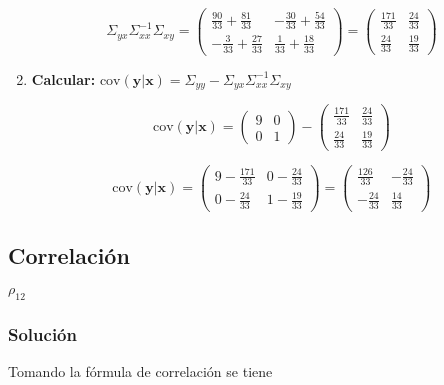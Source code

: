 \begin{enumerate}
    $$
    \Sigma_{yx} \Sigma_{xx}^{-1} \Sigma_{xy} =
    \begin{pmatrix}
    \frac{90}{33}+\frac{81}{33} & -\frac{30}{33}+\frac{54}{33} \\
    -\frac{3}{33}+\frac{27}{33} & \frac{1}{33}+\frac{18}{33}
    \end{pmatrix} =
    \begin{pmatrix}
    \frac{171}{33} & \frac{24}{33} \\
    \frac{24}{33} & \frac{19}{33}
    \end{pmatrix}
    $$

    \item \textbf{Calcular: }$\text{cov}(\mathbf{y}|\mathbf{x}) =
\Sigma_{yy} - \Sigma_{yx} \Sigma_{xx}^{-1} \Sigma_{xy}$

    $$
    \text{cov}(\mathbf{y}|\mathbf{x}) =
    \begin{pmatrix}
    9 & 0 \\
    0 & 1
    \end{pmatrix}
    -
    \begin{pmatrix}
    \frac{171}{33} & \frac{24}{33} \\
    \frac{24}{33} & \frac{19}{33}
    \end{pmatrix}
    $$

    $$
    \text{cov}(\mathbf{y}|\mathbf{x}) =
    \begin{pmatrix}
    9-\frac{171}{33} & 0 - \frac{24}{33} \\
    0- \frac{24}{33} & 1 - \frac{19}{33} 
    \end{pmatrix} =
    \begin{pmatrix}
    \frac{126}{33} & -\frac{24}{33} \\
    -\frac{24}{33} & \frac{14}{33} 
    \end{pmatrix}
    
    $$

\end{enumerate}

\subsection{Correlación}

$\rho_{12}$

\subsubsection{Solución}

Tomando la fórmula de correlación se tiene 

